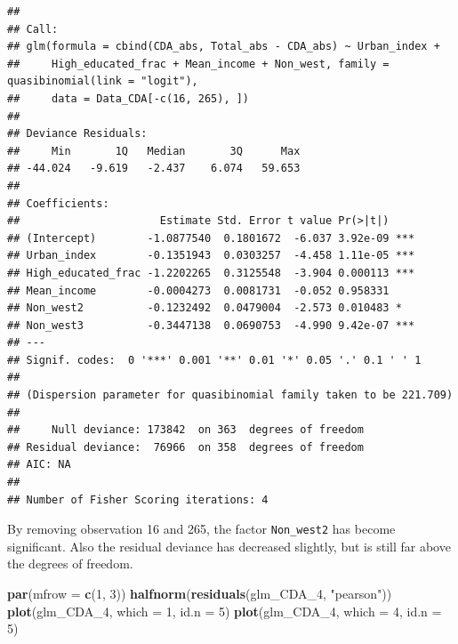 \documentclass[11pt,]{article}
\newenvironment{Shaded}{\begin{snugshade}}{\end{snugshade}}
\newcommand{\KeywordTok}[1]{\textcolor[rgb]{0.13,0.29,0.53}{\textbf{#1}}}
\newcommand{\DataTypeTok}[1]{\textcolor[rgb]{0.13,0.29,0.53}{#1}}
\newcommand{\DecValTok}[1]{\textcolor[rgb]{0.00,0.00,0.81}{#1}}
\newcommand{\StringTok}[1]{\textcolor[rgb]{0.31,0.60,0.02}{#1}}
\newcommand{\NormalTok}[1]{#1}
\begin{document}
\begin{verbatim}
## 
## Call:
## glm(formula = cbind(CDA_abs, Total_abs - CDA_abs) ~ Urban_index + 
##     High_educated_frac + Mean_income + Non_west, family = quasibinomial(link = "logit"), 
##     data = Data_CDA[-c(16, 265), ])
## 
## Deviance Residuals: 
##     Min       1Q   Median       3Q      Max  
## -44.024   -9.619   -2.437    6.074   59.653  
## 
## Coefficients:
##                      Estimate Std. Error t value Pr(>|t|)    
## (Intercept)        -1.0877540  0.1801672  -6.037 3.92e-09 ***
## Urban_index        -0.1351943  0.0303257  -4.458 1.11e-05 ***
## High_educated_frac -1.2202265  0.3125548  -3.904 0.000113 ***
## Mean_income        -0.0004273  0.0081731  -0.052 0.958331    
## Non_west2          -0.1232492  0.0479004  -2.573 0.010483 *  
## Non_west3          -0.3447138  0.0690753  -4.990 9.42e-07 ***
## ---
## Signif. codes:  0 '***' 0.001 '**' 0.01 '*' 0.05 '.' 0.1 ' ' 1
## 
## (Dispersion parameter for quasibinomial family taken to be 221.709)
## 
##     Null deviance: 173842  on 363  degrees of freedom
## Residual deviance:  76966  on 358  degrees of freedom
## AIC: NA
## 
## Number of Fisher Scoring iterations: 4
\end{verbatim}

By removing observation 16 and 265, the factor \texttt{Non\_west2} has
become significant. Also the residual deviance has decreased slightly,
but is still far above the degrees of freedom.

\begin{Shaded}
\begin{Highlighting}[]
\KeywordTok{par}\NormalTok{(}\DataTypeTok{mfrow =} \KeywordTok{c}\NormalTok{(}\DecValTok{1}\NormalTok{, }\DecValTok{3}\NormalTok{))}
\KeywordTok{halfnorm}\NormalTok{(}\KeywordTok{residuals}\NormalTok{(glm_CDA_}\DecValTok{4}\NormalTok{, }\StringTok{"pearson"}\NormalTok{))}
\KeywordTok{plot}\NormalTok{(glm_CDA_}\DecValTok{4}\NormalTok{, }\DataTypeTok{which =} \DecValTok{1}\NormalTok{, }\DataTypeTok{id.n =} \DecValTok{5}\NormalTok{)}
\KeywordTok{plot}\NormalTok{(glm_CDA_}\DecValTok{4}\NormalTok{, }\DataTypeTok{which =} \DecValTok{4}\NormalTok{, }\DataTypeTok{id.n =} \DecValTok{5}\NormalTok{)}
\end{Highlighting}
\end{Shaded}
\end{document}
